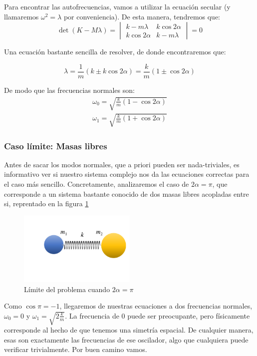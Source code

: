 \documentclass[a4paper,12pt]{article}
\begin{document}
Para encontrar las autofrecuencias, vamos a utilizar la ecuación secular (y llamaremos $\omega^2 = \lambda$ por conveniencia). De esta manera, tendremos que:
\begin{equation}
\det\left(K - M \lambda\right) = \begin{vmatrix}
  k-m\lambda & k\cos{2\alpha}\\ k\cos{2\alpha}&k-m\lambda
\end{vmatrix}=0
\end{equation}

Una ecuación bastante sencilla de resolver, de donde encontraremos que:

$$\lambda = \frac{1}{m} (k \pm k\cos{2\alpha}) = \frac{k}{m} (1\pm \cos{2\alpha})$$

De modo que las frecuencias normales son:
\begin{equation}
  \begin{aligned}
  \omega_0 = \sqrt{ \frac{k}{m} (1 - \cos{2\alpha})}\\
  \omega_1 = \sqrt{ \frac{k}{m} (1 + \cos{2\alpha})}
  \end{aligned}
\end{equation}
\subsubsection*{Caso límite: Masas libres}

Antes de sacar los modos normales, que a priori pueden ser nada-triviales, es informativo ver si nuestro sistema complejo nos da las ecuaciones correctas para el caso más sencillo. Concretamente, analizaremos el caso de $2\alpha = \pi$, que corresponde a un sistema bastante conocido de dos masas libres acopladas entre si, reprentado en la figura \ref{masamuelle}

\begin{figure}[h]
  \centering
  \caption{Límite del problema cuando $2\alpha = \pi$}
  \label{masamuelle}
  \includegraphics[width=0.5\textwidth]{masamuelle.png}
\end{figure}

Como $\cos{\pi} = -1$, llegaremos de nuestras ecuaciones a dos frecuencias normales, $\omega_0 = 0$ y $\omega_1 = \sqrt{2\frac{k}{m}}$. La frecuencia de 0 puede ser preocupante, pero físicamente corresponde al hecho de que tenemos una simetría espacial. De cualquier manera, esas son exactamente las frecuencias de ese oscilador, algo que cualquiera puede verificar trivialmente. Por buen camino vamos. 
\end{document}
